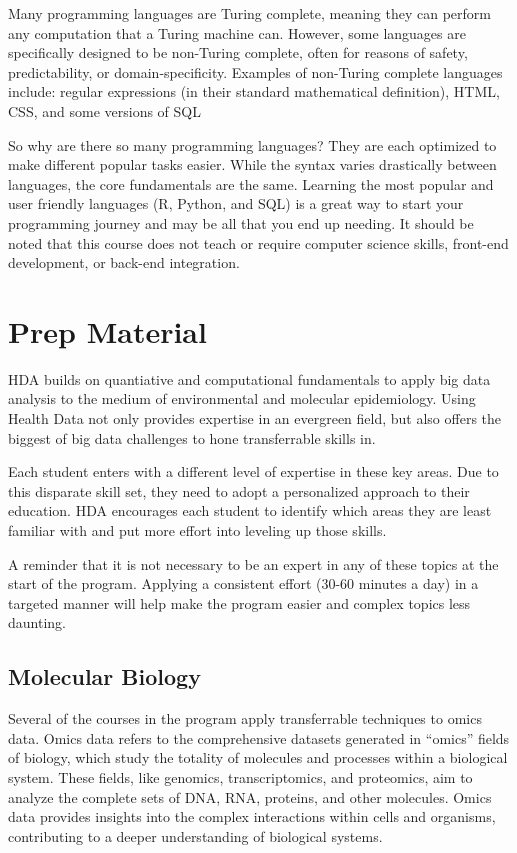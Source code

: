 \documentclass[
]{book}
\begin{document}
Many programming languages are Turing complete, meaning they can perform any computation that a Turing machine can. However, some languages are specifically designed to be non-Turing complete, often for reasons of safety, predictability, or domain-specificity. Examples of non-Turing complete languages include: regular expressions (in their standard mathematical definition), HTML, CSS, and some versions of SQL

So why are there so many programming languages? They are each optimized to make different popular tasks easier. While the syntax varies drastically between languages, the core fundamentals are the same. Learning the most popular and user friendly languages (R, Python, and SQL) is a great way to start your programming journey and may be all that you end up needing. It should be noted that this course does not teach or require computer science skills, front-end development, or back-end integration.

\chapter{Prep Material}\label{prep-material}

HDA builds on quantiative and computational fundamentals to apply big data analysis to the medium of environmental and molecular epidemiology. Using Health Data not only provides expertise in an evergreen field, but also offers the biggest of big data challenges to hone transferrable skills in.

Each student enters with a different level of expertise in these key areas. Due to this disparate skill set, they need to adopt a personalized approach to their education. HDA encourages each student to identify which areas they are least familiar with and put more effort into leveling up those skills.

A reminder that it is not necessary to be an expert in any of these topics at the start of the program. Applying a consistent effort (30-60 minutes a day) in a targeted manner will help make the program easier and complex topics less daunting.

\section{Molecular Biology}\label{molecular-biology}

Several of the courses in the program apply transferrable techniques to omics data. Omics data refers to the comprehensive datasets generated in ``omics'' fields of biology, which study the totality of molecules and processes within a biological system. These fields, like genomics, transcriptomics, and proteomics, aim to analyze the complete sets of DNA, RNA, proteins, and other molecules. Omics data provides insights into the complex interactions within cells and organisms, contributing to a deeper understanding of biological systems.
\end{document}
